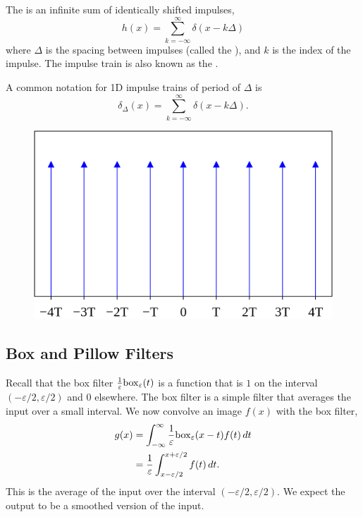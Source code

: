 \begin{definition}\label{def:impulse-train}
    The  is an infinite sum of identically shifted impulses, \[
        h(x) = \sum_{k = -\infty}^{\infty} \delta(x - k\Delta)
    \] where $\Delta$ is the spacing between impulses (called the ), and $k$ is the index of the impulse. The impulse train is also known as the .
\end{definition}

\begin{remark}
    A common notation for 1D impulse trains of period of $\Delta$ is \[ \delta_{\Delta}(x) = \sum_{k = -\infty}^{\infty} \delta(x - k\Delta). \]
\end{remark}

\begin{figure}[ht!]
    \centering
    \includegraphics[width=0.45\linewidth]{figures/Dirac_comb.svg.png}

\end{figure}

\subsection{Box and Pillow Filters}

Recall that the box filter $\frac{1}{\varepsilon} \mathrm{box}_\varepsilon(t)$ is a function that is $1$ on the interval $(-\varepsilon/2, \varepsilon/2)$ and $0$ elsewhere. The box filter is a simple filter that averages the input over a small interval. We now convolve an image $f(x)$ with the box filter, \begin{align*}
    g(x) & = \int_{-\infty}^{\infty} \frac{1}{\varepsilon} \mathrm{box}_\varepsilon(x - t) f(t) \, dt \\
         & = \frac{1}{\varepsilon} \int_{x - \varepsilon/2}^{x + \varepsilon/2} f(t) \, dt.
\end{align*} This is the average of the input over the interval $(-\varepsilon/2, \varepsilon/2)$. We expect the output to be a smoothed version of the input.

